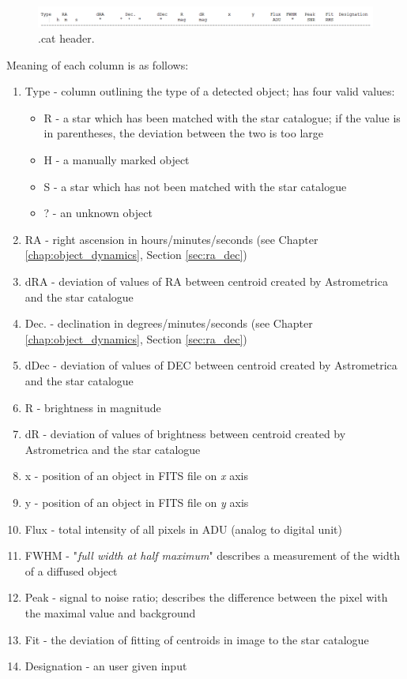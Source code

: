 	\begin{figure}[H]
	  \includegraphics[width=\linewidth]{images/cat_columns}
		  \caption{.cat header.}
	  \label{fig:cat_header}
	\end{figure}
	
	Meaning of each column is as follows:
	
	\begin{enumerate}
		\item Type - column outlining the type of a detected object; has four valid values:
		\begin{itemize}
			\item R - a star which has been matched with the star catalogue; if the value is in parentheses, the deviation between the two is too large
			\item H - a manually marked object
			\item S - a star which has not been matched with the star catalogue
			\item ? - an unknown object
		\end{itemize}
		\item RA - right ascension in hours/minutes/seconds (see Chapter \ref{chap:object_dynamics}, Section \ref{sec:ra_dec})
		\item dRA - deviation of values of RA between centroid created by Astrometrica and the star catalogue
		\item Dec. - declination in degrees/minutes/seconds (see Chapter \ref{chap:object_dynamics}, Section \ref{sec:ra_dec})
		\item dDec - deviation of values of DEC between centroid created by Astrometrica and the star catalogue
		\item R - brightness in magnitude
		\item dR - deviation of values of brightness between centroid created by Astrometrica and the star catalogue
		\item x - position of an object in FITS file on \emph{x} axis
		\item y - position of an object in FITS file on \emph{y} axis
		\item Flux - total intensity of all pixels in ADU (analog to digital unit)
		\item FWHM - "\emph{full width at half maximum}" describes a measurement of the width of a diffused object
		\item Peak - signal to noise ratio; describes the difference between the pixel with the maximal value and background
		\item Fit - the deviation of fitting of centroids in image to the star catalogue
		\item Designation - an user given input
	\end{enumerate}
	
